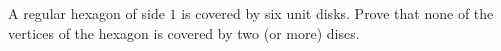 A regular hexagon of side $1$ is covered by six unit disks. Prove that none of the vertices of the hexagon is covered by two (or more) discs.
